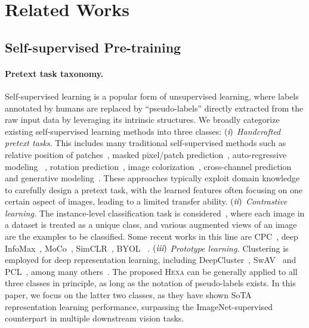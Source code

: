 \documentclass[10pt,twocolumn,letterpaper]{article}
\newcommand{\RN}[1]{\textup{\lowercase\expandafter{\it \romannumeral#1}}}
\newcommand{\shortname}{\textsc{Hexa}}
\begin{document}
\vspace{-4mm}
\section{Related Works}
\vspace{-1mm}
\subsection{Self-supervised Pre-training} 
\paragraph{Pretext task taxonomy.}
Self-supervised learning is a popular form of unsupervised learning, where  labels annotated by humans are replaced by ``pseudo-labels'' directly extracted from the raw input data by leveraging its intrinsic structures. We broadly categorize existing self-supervised learning methods into three classes: 
$(\RN{1})$
{\em Handcrafted pretext tasks}. This includes many traditional self-supervised methods such as relative position of patches~\cite{doersch2015unsupervised,noroozi2016unsupervised}, masked pixel/patch prediction~\cite{pathak2016context,trinh2019selfie}, auto-regressive modeling~\cite{chen2020generative} , rotation prediction~\cite{gidaris2018unsupervised}, image colorization~\cite{zhang2016colorful,larsson2016learning}, cross-channel prediction~\cite{zhang2017split} and generative modeling~\cite{pu2016variational,donahue2019large}. These approaches typically exploit domain knowledge to carefully design a pretext task, with the learned features often focusing on one certain aspect of images, leading to a limited transfer ability.
$(\RN{2})$ 
{\em Contrastive learning.} The instance-level classification task is considered~\cite{dosovitskiy2015discriminative,zhuang2019local}, where each image in a dataset is treated as a unique class, and various augmented views of an image are the examples to be classified. Some recent works in this line are CPC~\cite{oord2018representation}, deep InfoMax~\cite{hjelm2018learning,bachman2019learning}, MoCo~\cite{he2020momentum}, SimCLR~\cite{chen2020simple}, BYOL~\cite{grill2020bootstrap} \etc.
$(\RN{3})$
{\em Prototype learning.} Clustering is employed for deep representation learning, including DeepCluster~\cite{caron2018deepcluster}, SwAV~\cite{caron2020unsupervised} and PCL~\cite{li2020prototypical}, among many others~\cite{xie2016unsupervised,yang2016joint,ji2019invariant,zhan2020online}. 
The proposed \shortname{} can be generally applied to all three classes in principle, as long as the notation of pseudo-labels exists. In this paper, we focus on the latter two classes, as they have shown SoTA representation learning performance, surpassing the ImageNet-supervised counterpart in multiple downstream vision tasks.
\end{document}
